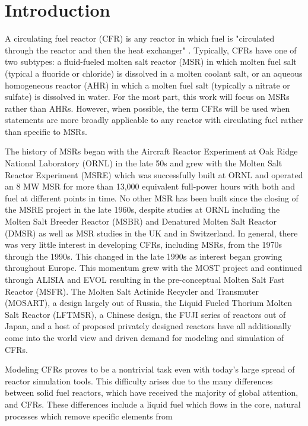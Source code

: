 \documentclass[review]{elsarticle}
\begin{document}
\section{Introduction} \label{sec:intro}
A circulating fuel reactor (CFR) is any reactor in which fuel is "circulated
 through the reactor and then the heat exchanger" \cite{ergen_1954}.
 Typically, CFRs have one of two subtypes: a fluid-fueled molten salt reactor
 (MSR) in which molten fuel salt (typical a fluoride or chloride) is dissolved
 in a molten coolant salt, or an aqueous homogeneous reactor (AHR) in which
 a molten fuel salt (typically a nitrate or sulfate) is dissolved in water.
 For the most part, this work will focus on MSRs rather than AHRs. However,
 when possible, the term CFRs will be used when statements are more broadly
 applicable to any reactor with circulating fuel rather than specific to MSRs.
\par The history of MSRs began with the Aircraft Reactor Experiment at Oak Ridge National
 Laboratory (ORNL) in the late 50s and grew with the Molten Salt Reactor Experiment
 (MSRE) which was successfully built at ORNL and operated an 8 MW MSR for more than 13,000
 equivalent full-power hours with both  and  fuel at different
points in time. No other MSR has been built since the closing of the MSRE project
 in the late 1960s, despite studies at ORNL including the Molten Salt Breeder
 Reactor (MSBR) and Denatured Molten Salt Reactor (DMSR) as well as MSR studies
 in the UK and in Switzerland. In general, there was very little interest in
 developing CFRs, including MSRs, from the 1970s through the 1990s.  This
 changed in the late 1990s as interest began growing throughout Europe. This momentum
grew with the MOST project and continued through ALISIA and EVOL resulting in
the pre-conceptual Molten Salt Fast Reactor (MSFR). The Molten Salt Actinide
Recycler and Transmuter (MOSART), a design largely out of Russia, the
Liquid Fueled Thorium Molten Salt Reactor (LFTMSR), a Chinese design, the
FUJI series of reactors out of Japan, and a host of proposed privately designed
reactors have all additionally come into the world view and driven demand for
modeling and simulation of CFRs. 
\par Modeling CFRs proves to be a nontrivial task even with today's
large spread of reactor simulation tools. This difficulty arises due to
the many differences between solid fuel reactors, which have received the
majority of global attention, and CFRs. These differences include a liquid fuel
 which flows in the core, natural processes which remove specific elements from
\end{document}
